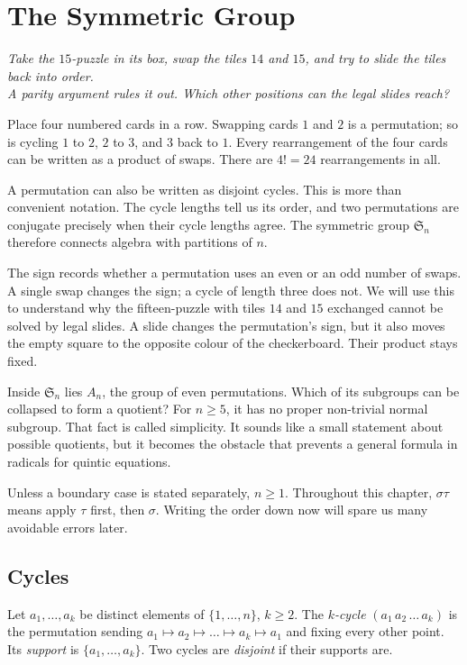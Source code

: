 \chapter{The Symmetric Group}

\begin{center}\itshape
Take the $15$-puzzle in its box, swap the tiles $14$ and $15$, and try to slide the tiles back into order.\\
A parity argument rules it out. Which other positions can the legal slides reach?
\end{center}

Place four numbered cards in a row. Swapping cards $1$ and $2$ is a permutation; so is cycling $1$ to $2$, $2$ to $3$, and $3$ back to $1$. Every rearrangement of the four cards can be written as a product of swaps. There are $4!=24$ rearrangements in all.

A permutation can also be written as disjoint cycles. This is more than convenient notation. The cycle lengths tell us its order, and two permutations are conjugate precisely when their cycle lengths agree. The symmetric group $\mathfrak S_n$ therefore connects algebra with partitions of $n$.

The sign records whether a permutation uses an even or an odd number of swaps. A single swap changes the sign; a cycle of length three does not. We will use this to understand why the fifteen-puzzle with tiles $14$ and $15$ exchanged cannot be solved by legal slides. A slide changes the permutation's sign, but it also moves the empty square to the opposite colour of the checkerboard. Their product stays fixed.

Inside $\mathfrak S_n$ lies $A_n$, the group of even permutations. Which of its subgroups can be collapsed to form a quotient? For $n\ge5$, it has no proper non-trivial normal subgroup. That fact is called simplicity. It sounds like a small statement about possible quotients, but it becomes the obstacle that prevents a general formula in radicals for quintic equations.

Unless a boundary case is stated separately, $n\ge1$. Throughout this chapter, $\sigma\tau$ means apply $\tau$ first, then $\sigma$. Writing the order down now will spare us many avoidable errors later.

\section{Cycles}

\begin{definition}\label{def:cycle}
Let $a_1,\dots,a_k$ be distinct elements of $\{1,\dots,n\}$, $k\ge2$. The \emph{$k$-cycle} $(a_1\,a_2\,\dots\,a_k)$ is the permutation sending $a_1\mapsto a_2\mapsto\dots\mapsto a_k\mapsto a_1$ and fixing every other point. Its \emph{support} is $\{a_1,\dots,a_k\}$. Two cycles are \emph{disjoint} if their supports are.
\end{definition}

